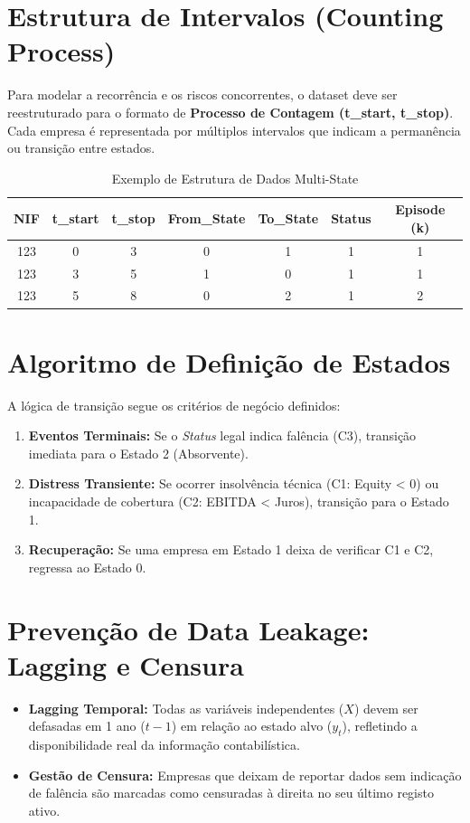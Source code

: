 \section{Estrutura de Intervalos (Counting Process)}

Para modelar a recorrência e os riscos concorrentes, o dataset deve ser reestruturado para o formato de \textbf{Processo de Contagem (t\_start, t\_stop)}. Cada empresa é representada por múltiplos intervalos que indicam a permanência ou transição entre estados.

\begin{table}[h]
\centering
\caption{Exemplo de Estrutura de Dados Multi-State}
\begin{tabular}{@{}ccccccc@{}}
\toprule
\textbf{NIF} & \textbf{t\_start} & \textbf{t\_stop} & \textbf{From\_State} & \textbf{To\_State} & \textbf{Status} & \textbf{Episode (k)} \\ \midrule
123 & 0 & 3 & 0 & 1 & 1 & 1 \\
123 & 3 & 5 & 1 & 0 & 1 & 1 \\
123 & 5 & 8 & 0 & 2 & 1 & 2 \\ \bottomrule
\end{tabular}
\end{table}

\section{Algoritmo de Definição de Estados}

A lógica de transição segue os critérios de negócio definidos:
\begin{enumerate}
    \item \textbf{Eventos Terminais:} Se o \textit{Status} legal indica falência (C3), transição imediata para o Estado 2 (Absorvente).
    \item \textbf{Distress Transiente:} Se ocorrer insolvência técnica (C1: Equity < 0) ou incapacidade de cobertura (C2: EBITDA < Juros), transição para o Estado 1.
    \item \textbf{Recuperação:} Se uma empresa em Estado 1 deixa de verificar C1 e C2, regressa ao Estado 0.
\end{enumerate}

\section{Prevenção de Data Leakage: Lagging e Censura}

\begin{itemize}
    \item \textbf{Lagging Temporal:} Todas as variáveis independentes ($X$) devem ser defasadas em 1 ano ($t-1$) em relação ao estado alvo ($y_t$), refletindo a disponibilidade real da informação contabilística.
    \item \textbf{Gestão de Censura:} Empresas que deixam de reportar dados sem indicação de falência são marcadas como censuradas à direita no seu último registo ativo.
\end{itemize}
